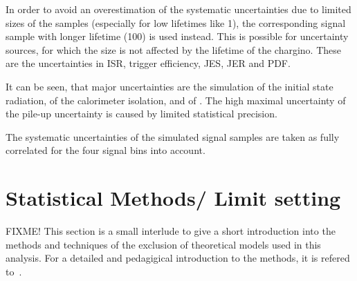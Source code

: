 In order to avoid an overestimation of the systematic uncertainties due to limited sizes of the samples (especially for low lifetimes like 1\cm), the corresponding signal sample with longer lifetime (100\cm) is used instead.
This is possible for uncertainty sources, for which the size is not affected by the lifetime of the chargino.
These are the uncertainties in ISR, trigger efficiency, JES, JER and PDF.

It can be seen, that major uncertainties are the simulation of the initial state radiation, of the calorimeter isolation, and of \ias.
The high maximal uncertainty of the pile-up uncertainty is caused by limited statistical precision.

The systematic uncertainties of the simulated signal samples are taken as fully correlated for the four signal bins into account.

\section{Statistical Methods/ Limit setting}
FIXME!
This section is a small interlude to give a short introduction into the methods and techniques of the exclusion of theoretical models used in this analysis.
For a detailed and pedagigical introduction to the methods, it is refered to~\cite{bib:Ott_Thesis}.

